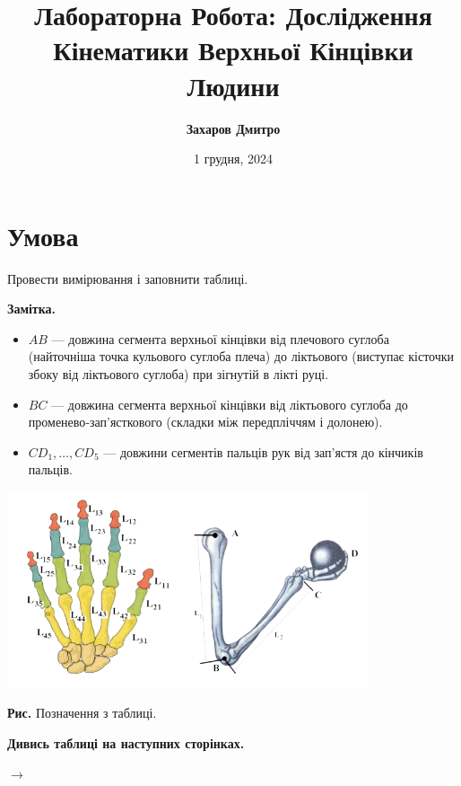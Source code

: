\documentclass{hw_template}
\title{\bfseries Лабораторна Робота: Дослідження Кінематики Верхньої 
Кінцівки Людини}
\author{\bfseries Захаров Дмитро}
\date{1 грудня, 2024}
\begin{document}
\pagestyle{fancy}

\maketitle

\section{Умова}
\begin{problems}
    Провести вимірювання і заповнити таблиці. 

    \textbf{Замітка.} 
    
    \begin{itemize}
        \item $AB$ --- довжина сегмента верхньої кінцівки від плечового суглоба (найточніша
    точка кульового суглоба плеча) до ліктьового (виступає кісточки збоку від
    ліктьового суглоба) при зігнутій в лікті руці.
        \item $BC$ --- довжина сегмента верхньої кінцівки від ліктьового суглоба до
    променево‐зап'ясткового (складки між передпліччям і долонею).
        \item $CD_1,\dots,CD_5$ --- довжини сегментів пальців рук від зап'ястя до
    кінчиків пальців.
    \end{itemize}

    \begin{center}
        \includegraphics[width=0.8\textwidth]{images/problem_statement.png}

        \scriptsize
        \textbf{Рис.} Позначення з таблиці.
    \end{center}
\end{problems}

\vspace{20px}

\begin{center}
    \large
    \textbf{Дивись таблиці на наступних сторінках.}

    $\to$
\end{center}
\end{document}
